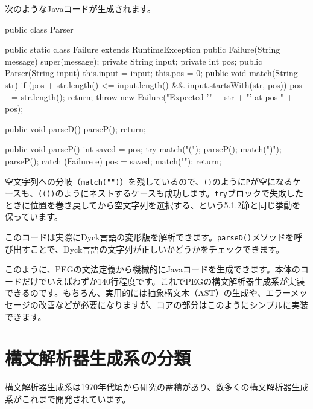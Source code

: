 次のようなJavaコードが生成されます。

\begin{codescreen}{}
public class Parser {
    public static class Failure extends RuntimeException {
        public Failure(String message) {
            super(message);
        }
    }
    private String input;
    private int pos;
    public Parser(String input) {
        this.input = input;
        this.pos = 0;
    }
    public void match(String str) {
        if (pos + str.length() <= input.length() &&
            input.startsWith(str, pos)) {
            pos += str.length();
            return;
        }
        throw new Failure("Expected '" + str + "' at pos " + pos);
    }

    public void parseD() {
        parseP();
        return;
    }

    public void parseP() {
        int saved = pos;
        try {
            match("(");
            parseP();
            match(")");
            parseP();
        } catch (Failure e) {
            pos = saved;
            match("");
        }
        return;
    }
}
\end{codescreen}

空文字列への分岐（\texttt{match("")}）を残しているので、\texttt{()}のように\texttt{P}が空になるケースも、\texttt{(())}のようにネストするケースも成功します。\texttt{try}ブロックで失敗したときに位置を巻き戻してから空文字列を選択する、という5.1.2節と同じ挙動を保っています。

このコードは実際にDyck言語の変形版を解析できます。\texttt{parseD()}メソッドを呼び出すことで、Dyck言語の文字列が正しいかどうかをチェックできます。

このように、PEGの文法定義から機械的にJavaコードを生成できます。本体のコードだけでいえばわずか140行程度です。これでPEGの構文解析器生成系が実装できるのです。もちろん、実用的には抽象構文木（AST）の生成や、エラーメッセージの改善などが必要になりますが、コアの部分はこのようにシンプルに実装できます。

\section{構文解析器生成系の分類}

構文解析器生成系は1970年代頃から研究の蓄積があり、数多くの構文解析器生成系がこれまで開発されています。

